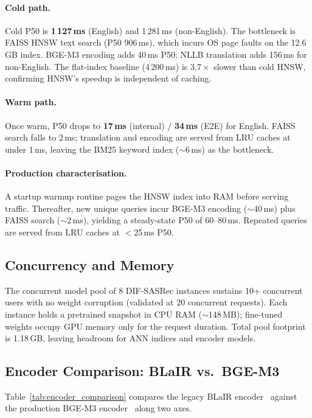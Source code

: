 

\paragraph{Cold path.}
Cold P50 is \textbf{1\,127\,ms} (English) and 1\,281\,ms (non-English).
The bottleneck is FAISS HNSW text search (P50 906\,ms), which incurs OS
page faults on the 12.6\,GB index. BGE-M3 encoding adds 40\,ms P50;
NLLB translation adds 156\,ms for non-English.
The flat-index baseline (4\,200\,ms) is $3.7\times$ slower than cold HNSW,
confirming HNSW's speedup is independent of caching.

\paragraph{Warm path.}
Once warm, P50 drops to \textbf{17\,ms} (internal) / \textbf{34\,ms}
(E2E) for English. FAISS search falls to 2\,ms; translation and encoding
are served from LRU caches at under 1\,ms, leaving the BM25 keyword index
($\sim$6\,ms) as the bottleneck.

\paragraph{Production characterisation.}
A startup warmup routine pages the HNSW index into RAM before serving
traffic. Thereafter, new unique queries incur BGE-M3 encoding ($\sim$40\,ms)
plus FAISS search ($\sim$2\,ms), yielding a steady-state P50 of 60--80\,ms.
Repeated queries are served from LRU caches at $<$25\,ms P50.

\subsection{Concurrency and Memory}
The concurrent model pool of 8 DIF-SASRec instances sustains 10+ concurrent users
with no weight corruption (validated at 20 concurrent requests).
Each instance holds a pretrained snapshot in CPU RAM ($\sim$148\,MB);
fine-tuned weights occupy GPU memory only for the request duration.
Total pool footprint is 1.18\,GB, leaving headroom for ANN indices
and encoder models.

\subsection{Encoder Comparison: BLaIR vs.\ BGE-M3}
\label{ssec:encoder}

Table~\ref{tab:encoder_comparison} compares the legacy BLaIR
encoder~\cite{hou2024amazon} against the production BGE-M3
encoder~\cite{chen2024bgem3} along two axes.


